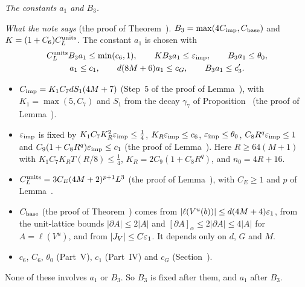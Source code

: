 \begin{detail}\label{det:ledger-a1B3}
\emph{The constants $a_1$ and $B_3$.}

\emph{What the note says} (the proof of Theorem~). $B_3=\max(4C_{\rm imp},C_{\rm base})$ and $K=(1+C_6)C^{\rm units}_L$. The constant $a_1$ is chosen with
\begin{gather*}
C^{\rm units}_LB_3a_1\le\min(c_6,1),\qquad KB_3a_1\le\varepsilon_{\rm imp},\qquad B_3a_1\le\theta_0,\\
a_1\le c_1,\qquad d(8M+6)a_1\le c_G,\qquad B_3a_1\le c'_3 .
\end{gather*}

\begin{step}
\begin{itemize}
\item $C_{\rm imp}=K_1C_7dS_1(4M+7)$ (Step~5 of the proof of Lemma~), with $K_1=\max(5,C_7)$ and $S_1$ from the decay $\gamma_7$ of Proposition~ (the proof of Lemma~).
\item $\varepsilon_{\rm imp}$ is fixed by $K_1C_7K_R^2\varepsilon_{\rm imp}\le\frac14$, $K_R\varepsilon_{\rm imp}\le c_6$, $\varepsilon_{\rm imp}\le\theta_0$, $C_8R^q\varepsilon_{\rm imp}\le1$ and $C_9(1+C_8R^q)\varepsilon_{\rm imp}\le c_1$ (the proof of Lemma~). Here $R\ge64(M+1)$ with $K_1C_7K_RT(R/8)\le\frac14$, $K_R=2C_9(1+C_8R^q)$, and $n_0=4R+16$.
\item $C^{\rm units}_L=3C_E(4M+2)^{p+1}L^3$ (the proof of Lemma~), with $C_E\ge1$ and $p$ of Lemma~.
\item $C_{\rm base}$ (the proof of Theorem~) comes from $|\ell(V^u(b))|\le d(4M+4)\varepsilon_1$, from the unit-lattice bounds $|\partial A|\le2|A|$ and $[\partial A]_\alpha\le2|\partial A|\le4|A|$ for $A=\ell(V^u)$, and from $|J_V|\le C\varepsilon_1$. It depends only on $d$, $G$ and $M$.
\item $c_6$, $C_6$, $\theta_0$ (Part~V), $c_1$ (Part~IV) and $c_G$ (Section~).
\end{itemize}
None of these involves $a_1$ or $B_3$. So $B_3$ is fixed after them, and $a_1$ after $B_3$.
\end{step}


\end{detail}
